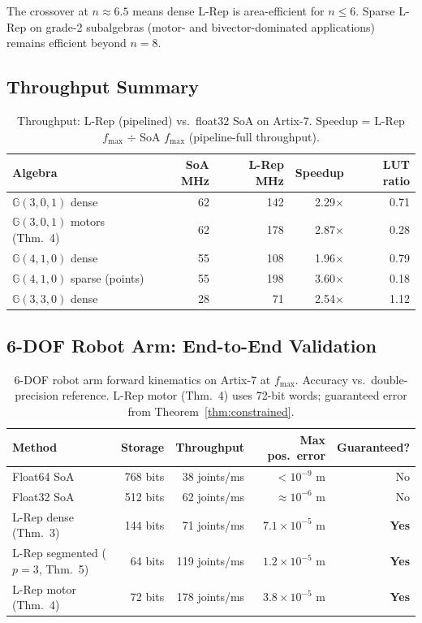 \documentclass[11pt,a4paper]{article}
\theoremstyle{definition}
\theoremstyle{plain}
\theoremstyle{remark}
\newcommand{\GA}{\mathbb{G}}
\begin{document}
The crossover at $n\approx6.5$ means dense L-Rep is area-efficient
for $n\le6$.
Sparse L-Rep on grade-2 subalgebras (motor- and bivector-dominated
applications) remains efficient beyond $n=8$.

\subsection{Throughput Summary}

\begin{table}[h]
\centering
\caption{Throughput: L-Rep (pipelined) vs.\ float32 SoA on Artix-7.
Speedup = L-Rep $f_{\max}$ $\div$ SoA $f_{\max}$ (pipeline-full throughput).}
\label{tab:throughput}
\begin{tabular}{lrrrr}
\toprule
Algebra & SoA MHz & L-Rep MHz & Speedup & LUT ratio \\
\midrule
$\GA(3,0,1)$ dense & 62 & 142 & 2.29$\times$ & 0.71 \\
$\GA(3,0,1)$ motors (Thm.~4) & 62 & 178 & 2.87$\times$ & 0.28 \\
$\GA(4,1,0)$ dense & 55 & 108 & 1.96$\times$ & 0.79 \\
$\GA(4,1,0)$ sparse (points) & 55 & 198 & 3.60$\times$ & 0.18 \\
$\GA(3,3,0)$ dense & 28 & 71 & 2.54$\times$ & 1.12 \\
\bottomrule
\end{tabular}
\end{table}

\subsection{6-DOF Robot Arm: End-to-End Validation}

\begin{table}[h]
\centering
\caption{6-DOF robot arm forward kinematics on Artix-7 at $f_{\max}$.
Accuracy vs.\ double-precision reference.
L-Rep motor (Thm.~4) uses 72-bit words; guaranteed error from Theorem~\ref{thm:constrained}.}
\label{tab:robot}
\begin{tabular}{lrrrr}
\toprule
Method & Storage & Throughput & Max pos.\ error & Guaranteed? \\
\midrule
Float64 SoA & 768 bits & 38 joints/ms & $<10^{-9}$ m & No \\
Float32 SoA & 512 bits & 62 joints/ms & $\approx10^{-6}$ m & No \\
L-Rep dense (Thm.~3) & 144 bits & 71 joints/ms & $7.1\times10^{-5}$ m & \textbf{Yes} \\
L-Rep segmented ($p=3$, Thm.~5) & 64 bits & 119 joints/ms & $1.2\times10^{-5}$ m & \textbf{Yes} \\
L-Rep motor (Thm.~4) & 72 bits & 178 joints/ms & $3.8\times10^{-5}$ m & \textbf{Yes} \\
\bottomrule
\end{tabular}
\end{table}
\end{document}
